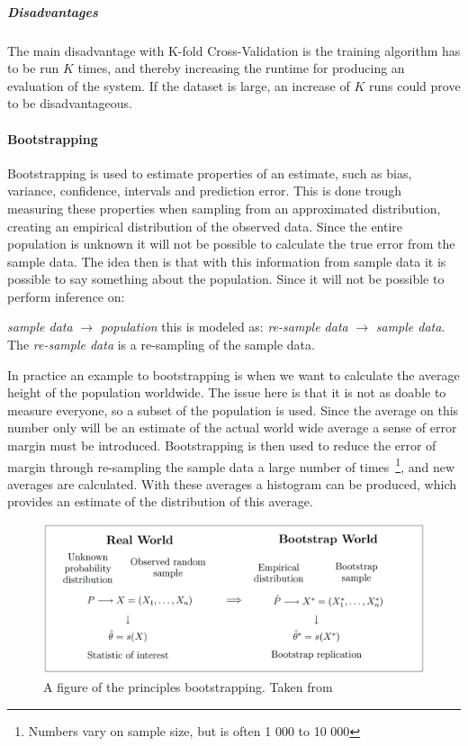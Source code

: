 \subparagraph{Disadvantages}
The main disadvantage with K-fold Cross-Validation is the training algorithm has
to be run $K$ times, and thereby increasing the runtime for producing an
evaluation of the system. If the dataset is large, an increase of $K$ runs could
prove to be disadvantageous.

\paragraph{Bootstrapping~\cite{efron1994introduction}}

Bootstrapping is used to estimate properties of an estimate, such as bias, variance, confidence, intervals and prediction error. This is done trough measuring these properties when sampling from an approximated distribution,
creating an empirical distribution of the observed data.
Since the entire population is unknown it will not be possible to calculate the true error from the sample data.
The idea then is that with this information from sample data it is possible to say something about the population.
Since it will not be possible to perform inference on:

\emph{sample data} $\rightarrow$ \emph{population} this is modeled as:
\emph{re-sample data} $\rightarrow$ \emph{sample data}.
The \emph{re-sample data} is a re-sampling of the sample data.

In practice an example to bootstrapping is when we want to calculate the average height of the population worldwide.
The issue here is that it is not as doable to measure everyone, so a subset of the population is used.
Since the average on this number only will be an estimate of the actual world wide average a sense of error margin must be introduced.
Bootstrapping is then used to reduce the error of margin through re-sampling the sample data a large number of times~\footnote{Numbers vary on sample size, but is often 1 000 to 10 000}, and new averages are calculated.
With these averages a histogram can be produced, which provides an estimate of the distribution of this average.

\begin{figure}[H]
    \includegraphics[width=5in]{image/bootstrap.png}
    \centering
    \caption[Bootstrapping principles]{A figure of the principles bootstrapping. Taken from~\cite{Eichler2003}}
    \label{figure:bootstrapping}
\end{figure}

